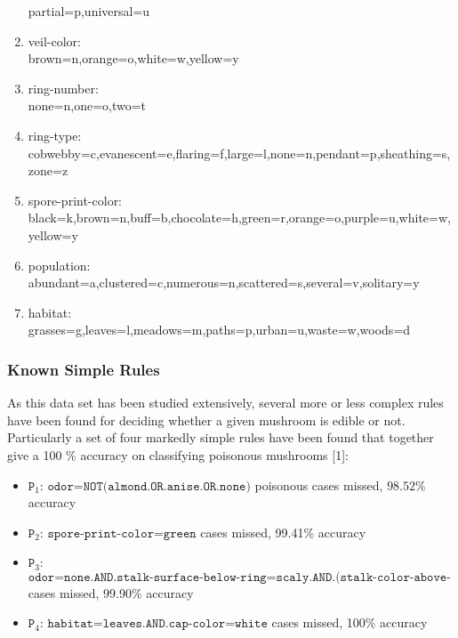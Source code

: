 \documentclass[11pt]{article}
\begin{document}
\begin{enumerate}
	partial=p,universal=u
	\item veil-color: \\
	brown=n,orange=o,white=w,yellow=y
	\item ring-number: \\
	none=n,one=o,two=t
	\item ring-type: \\
	cobwebby=c,evanescent=e,flaring=f,large=l,none=n,pendant=p,sheathing=s,zone=z
	\item spore-print-color: \\
	black=k,brown=n,buff=b,chocolate=h,green=r,orange=o,purple=u,white=w,yellow=y
	\item population: \\
	abundant=a,clustered=c,numerous=n,scattered=s,several=v,solitary=y
	\item habitat: \\
	 grasses=g,leaves=l,meadows=m,paths=p,urban=u,waste=w,woods=d
	
\end{enumerate}
  
    \hypertarget{known-simple-rules}{%
\subsubsection{Known Simple Rules}\label{known-simple-rules}}

As this data set has been studied extensively, several more or less
complex rules have been found for deciding whether a given mushroom is
edible or not. Particularly a set of four markedly simple rules have
been found that together give a 100 \% accuracy on classifying poisonous
mushrooms {[}1{]}:

\begin{itemize}
\item
  \(\texttt{P}_1\): $\texttt{odor=NOT(almond.OR.anise.OR.none)}$  poisonous cases missed, $98.52\%$ accuracy
\item
  \(\texttt{P}_2\): $\texttt{spore-print-color=green}$  cases missed, 99.41\%
  accuracy
\item
  \(\texttt{P}_3\): $\texttt{odor=none.AND.stalk-surface-below-ring=scaly.AND.(stalk-color-above-ring=NOT.brown)}$  cases missed, 99.90\% accuracy
\item
  \(\texttt{P}_4\): $\texttt{habitat=leaves.AND.cap-color=white}$  cases missed, 100\% accuracy
\end{itemize}
\end{document}
